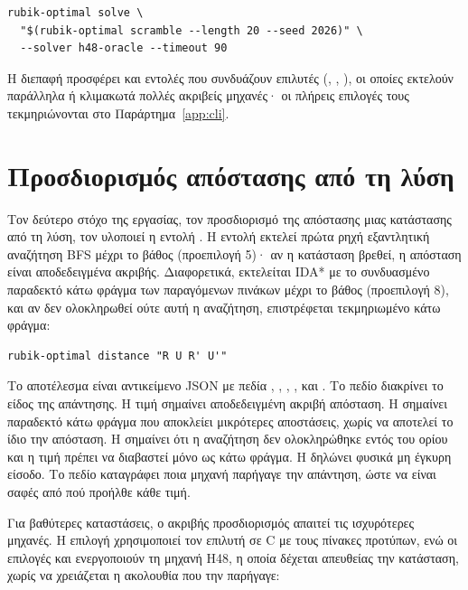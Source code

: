 \begin{verbatim}
rubik-optimal solve \
  "$(rubik-optimal scramble --length 20 --seed 2026)" \
  --solver h48-oracle --timeout 90
\end{verbatim}

Η διεπαφή προσφέρει και εντολές που συνδυάζουν επιλυτές (, , ), οι οποίες εκτελούν παράλληλα ή κλιμακωτά πολλές ακριβείς μηχανές· οι πλήρεις επιλογές τους τεκμηριώνονται στο Παράρτημα~\ref{app:cli}.

\section{Προσδιορισμός απόστασης από τη λύση}
\label{sec:usage-distance}

Τον δεύτερο στόχο της εργασίας, τον προσδιορισμό της απόστασης μιας κατάστασης από τη λύση, τον υλοποιεί η εντολή . Η εντολή εκτελεί πρώτα ρηχή εξαντλητική αναζήτηση BFS μέχρι το βάθος  (προεπιλογή 5)· αν η κατάσταση βρεθεί, η απόσταση είναι αποδεδειγμένα ακριβής. Διαφορετικά, εκτελείται IDA* με το συνδυασμένο παραδεκτό κάτω φράγμα των παραγόμενων πινάκων μέχρι το βάθος  (προεπιλογή 8), και αν δεν ολοκληρωθεί ούτε αυτή η αναζήτηση, επιστρέφεται τεκμηριωμένο κάτω φράγμα:

\begin{verbatim}
rubik-optimal distance "R U R' U'"
\end{verbatim}

Το αποτέλεσμα είναι αντικείμενο JSON με πεδία , , , ,  και . Το πεδίο  διακρίνει το είδος της απάντησης. Η τιμή  σημαίνει αποδεδειγμένη ακριβή απόσταση. Η  σημαίνει παραδεκτό κάτω φράγμα που αποκλείει μικρότερες αποστάσεις, χωρίς να αποτελεί το ίδιο την απόσταση. Η  σημαίνει ότι η αναζήτηση δεν ολοκληρώθηκε εντός του ορίου και η τιμή πρέπει να διαβαστεί μόνο ως κάτω φράγμα. Η  δηλώνει φυσικά μη έγκυρη είσοδο. Το πεδίο  καταγράφει ποια μηχανή παρήγαγε την απάντηση, ώστε να είναι σαφές από πού προήλθε κάθε τιμή.

Για βαθύτερες καταστάσεις, ο ακριβής προσδιορισμός απαιτεί τις ισχυρότερες μηχανές. Η επιλογή \code{--optimal-native} χρησιμοποιεί τον επιλυτή σε C με τους πίνακες προτύπων, ενώ οι επιλογές \code{--h48-native} και \code{--h48-oracle} ενεργοποιούν τη μηχανή H48, η οποία δέχεται απευθείας την κατάσταση, χωρίς να χρειάζεται η ακολουθία που την παρήγαγε:


